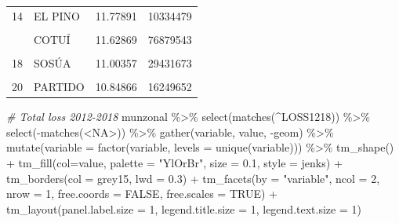 \documentclass[10pt,landscape,a3paper]{article}
\newenvironment{Shaded}{\begin{snugshade}}{\end{snugshade}}
\newcommand{\AttributeTok}[1]{\textcolor[rgb]{0.77,0.63,0.00}{#1}}
\newcommand{\CommentTok}[1]{\textcolor[rgb]{0.56,0.35,0.01}{\textit{#1}}}
\newcommand{\ConstantTok}[1]{\textcolor[rgb]{0.00,0.00,0.00}{#1}}
\newcommand{\DecValTok}[1]{\textcolor[rgb]{0.00,0.00,0.81}{#1}}
\newcommand{\FloatTok}[1]{\textcolor[rgb]{0.00,0.00,0.81}{#1}}
\newcommand{\FunctionTok}[1]{\textcolor[rgb]{0.00,0.00,0.00}{#1}}
\newcommand{\NormalTok}[1]{#1}
\newcommand{\SpecialCharTok}[1]{\textcolor[rgb]{0.00,0.00,0.00}{#1}}
\newcommand{\StringTok}[1]{\textcolor[rgb]{0.31,0.60,0.02}{#1}}
\begin{document}
\begin{table}[H]
\begin{tabular}[t]{llrr}
14 & EL PINO & 11.77891 & 10334479\\
\cellcolor{lightgray}{15} & \cellcolor{lightgray}{LAS MATAS DE SANTA CRUZ} & \cellcolor{lightgray}{11.74594} & \cellcolor{lightgray}{8424526}\\
\addlinespace
16 & COTUÍ & 11.62869 & 76879543\\
\cellcolor{lightgray}{17} & \cellcolor{lightgray}{PEDRO BRAND} & \cellcolor{lightgray}{11.51339} & \cellcolor{lightgray}{25532014}\\
18 & SOSÚA & 11.00357 & 29431673\\
\cellcolor{lightgray}{19} & \cellcolor{lightgray}{PEDRO SANTANA} & \cellcolor{lightgray}{10.95457} & \cellcolor{lightgray}{60055728}\\
20 & PARTIDO & 10.84866 & 16249652\\
\bottomrule
\end{tabular}
\end{table}

\begin{Shaded}
\begin{Highlighting}[]

\CommentTok{\# Total loss 2012{-}2018}
\NormalTok{munzonal }\SpecialCharTok{\%\textgreater{}\%} \FunctionTok{select}\NormalTok{(}\FunctionTok{matches}\NormalTok{(}\StringTok{\textquotesingle{}\^{}LOSS1218\textquotesingle{}}\NormalTok{)) }\SpecialCharTok{\%\textgreater{}\%} \FunctionTok{select}\NormalTok{(}\SpecialCharTok{{-}}\FunctionTok{matches}\NormalTok{(}\StringTok{\textquotesingle{}\textless{}NA\textgreater{}\textquotesingle{}}\NormalTok{)) }\SpecialCharTok{\%\textgreater{}\%} 
  \FunctionTok{gather}\NormalTok{(variable, value, }\SpecialCharTok{{-}}\NormalTok{geom) }\SpecialCharTok{\%\textgreater{}\%}
  \FunctionTok{mutate}\NormalTok{(}\AttributeTok{variable =} \FunctionTok{factor}\NormalTok{(variable, }\AttributeTok{levels =} \FunctionTok{unique}\NormalTok{(variable))) }\SpecialCharTok{\%\textgreater{}\%} 
  \FunctionTok{tm\_shape}\NormalTok{() }\SpecialCharTok{+}
    \FunctionTok{tm\_fill}\NormalTok{(}\AttributeTok{col=}\StringTok{\textquotesingle{}value\textquotesingle{}}\NormalTok{, }\AttributeTok{palette =} \StringTok{"YlOrBr"}\NormalTok{, }\AttributeTok{size =} \FloatTok{0.1}\NormalTok{, }\AttributeTok{style =} \StringTok{\textquotesingle{}jenks\textquotesingle{}}\NormalTok{) }\SpecialCharTok{+}
    \FunctionTok{tm\_borders}\NormalTok{(}\AttributeTok{col =} \StringTok{\textquotesingle{}grey15\textquotesingle{}}\NormalTok{, }\AttributeTok{lwd =} \FloatTok{0.3}\NormalTok{) }\SpecialCharTok{+}
    \FunctionTok{tm\_facets}\NormalTok{(}\AttributeTok{by =} \StringTok{"variable"}\NormalTok{, }\AttributeTok{ncol =} \DecValTok{2}\NormalTok{, }\AttributeTok{nrow =} \DecValTok{1}\NormalTok{, }\AttributeTok{free.coords =} \ConstantTok{FALSE}\NormalTok{, }\AttributeTok{free.scales =} \ConstantTok{TRUE}\NormalTok{) }\SpecialCharTok{+}
    \FunctionTok{tm\_layout}\NormalTok{(}\AttributeTok{panel.label.size =} \DecValTok{1}\NormalTok{, }\AttributeTok{legend.title.size =} \DecValTok{1}\NormalTok{, }\AttributeTok{legend.text.size =} \DecValTok{1}\NormalTok{)}
\end{Highlighting}
\end{Shaded}
\end{document}
